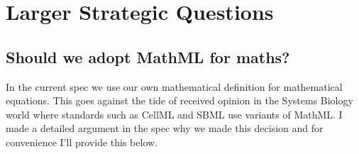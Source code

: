 \documentclass[a4paper,11pt]{article}
\newcommand{\uncertml}{UncertML\xspace}
\newcommand{\pharmml}{PharmML\xspace}
\begin{document}
\section{Larger Strategic Questions}



\subsection{Should we adopt MathML for maths?}

In the current spec we use our own mathematical definition for
mathematical equations. This goes against the tide of received opinion
in the Systems Biology world where standards such as CellML and SBML
use variants of MathML. I made a detailed argument in the spec why we
made this decision and for convenience I'll provide this below.
\end{document}
